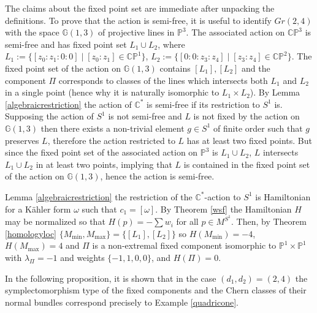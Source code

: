 \documentclass[12pt]{article}
\begin{document}
The claims about the fixed point set are immediate after unpacking the definitions. To prove that the action is semi-free, it is useful to identify $Gr(2,4)$ with the space $\mathbb{G}(1,3)$ of projective lines in $\mathbb{P}^3$. The associated action on $\mathbb{CP}^3$ is semi-free and has fixed point set $L_{1} \cup L_{2}$, where $L_{1} := \{[z_0:z_1:0:0] \mid [z_0:z_1] \in \mathbb{CP}^1 \}$,  $L_{2} := \{[0:0:z_3:z_4] \mid [z_3:z_4] \in \mathbb{CP}^2 \}$. The fixed point set of the action on $\mathbb{G}(1,3)$  contains $[L_{1}],[L_{2}]$ and the component $\Pi$ corresponds to classes of the lines which intersects both $L_{1}$ and $L_{2}$ in a single point (hence why it is naturally isomorphic to $L_{1} \times L_{2}$). By Lemma  \ref{algebraicrestriction} the action of $\mathbb{C}^*$ is semi-free if its restriction to $S^1$ is. Supposing the action of $S^1$ is not semi-free and $L$ is not fixed by the action on  $\mathbb{G}(1,3)$ then there exists a non-trivial element $g \in S^1$ of finite order such that $g$ preserves $L$, therefore the action restricted to $L$ has at least two fixed points. But since the fixed point set of the associated action on $\mathbb{P}^3$ is $L_{1} \cup L_{2}$, $L$ intersects $L_{1} \cup L_{2}$ in at least two points, implying that $L$ is contained in the fixed point set of the action on $\mathbb{G}(1,3)$, hence the action is semi-free.

Lemma  \ref{algebraicrestriction} the restriction of the $\mathbb{C}^*$-action to $S^1$ is Hamiltonian for a K\"{a}hler form $\omega$ such that $c_1 = [\omega]$. By Theorem \ref{wsf} the Hamiltonian $H$ may be normalized so that $H(p) =- \sum w_i$ for all $p \in M^{S^1}$. Then, by Theorem \ref{homologyloc} $\{M_{\min},M_{\max}\} = \{[L_1],[L_2]\}$ so  $H(M_{\min}) = -4$, $H(M_{\max}) = 4$ and $\Pi$ is a non-extremal fixed component isomorphic to $\mathbb{P}^1 \times \mathbb{P}^1$ with $\lambda_{\Pi} = -1$ and weights $\{-1,1,0,0\}$, and $H(\Pi)=0$.




In the following proposition, it is shown that in the case $(d_1,d_2)  =(2,4)$ the symplectomorphism type of the fixed components and the Chern classes of their normal bundles correspond precisely to Example \ref{quadricone}.
\end{document}
